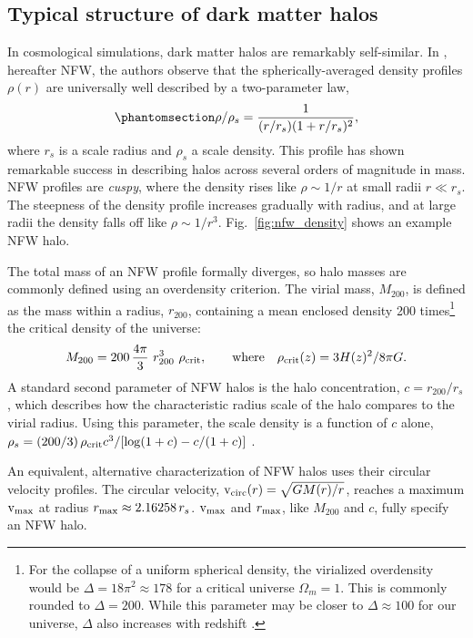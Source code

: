 \subsection{Typical structure of dark matter
halos}\label{typical-structure-of-dark-matter-halos}

In \LCDM{} cosmological simulations, dark matter halos are remarkably
self-similar. In \citet{NFW1996, NFW1997}, hereafter NFW, the authors
observe that the spherically-averaged density profiles \(\rho(r)\) are
universally well described by a two-parameter law,
\begin{equation}\protect\phantomsection\label{eq:nfw}{
\rho/\rho_s= \frac{1}{(r/r_s)(1+r/r_s)^2},
}\end{equation} where \(r_s\) is a scale radius and \(\rho_s\) a scale
density. This profile has shown remarkable success in describing \LCDM{}
halos across several orders of magnitude in mass. NFW profiles are
\emph{cuspy}, where the density rises like \(\rho \sim 1/r\) at small
radii \(r \ll r_s\). The steepness of the density profile increases
gradually with radius, and at large radii the density falls off like
\(\rho \sim 1/r^3\). Fig.~\ref{fig:nfw_density} shows an example NFW
halo.

The total mass of an NFW profile formally diverges, so halo masses are
commonly defined using an overdensity criterion. The virial mass,
\(M_{200}\), is defined as the mass within a radius, \(r_{200}\),
containing a mean enclosed density 200 times\footnote{For the collapse
  of a uniform spherical density, the virialized overdensity would be
  \(\Delta = 18\pi^2\approx 178\) for a critical universe
  \(\Omega_m = 1\). This is commonly rounded to \(\Delta = 200\). While
  this parameter may be closer to \(\Delta \approx 100\) for our
  universe, \(\Delta\) also increases with redshift \citep[using eq. 6
  from][]{bryan+norman1998}.} the critical density of the universe:
\begin{equation}{
M_{200} =200\,\frac{4\pi}{3} \ r_{200}^3\ \rho_{\rm crit}, \qquad {\rm where} \quad \rho_{\rm crit}(z) = 3H(z)^2 / 8\pi G.
}\end{equation} A standard second parameter of NFW halos is the halo
concentration, \(c=r_{200} / r_s\), which describes how the
characteristic radius scale of the halo compares to the virial radius.
Using this parameter, the scale density is a function of \(c\) alone,
\(\rho_s = (200/3)\,\rho_{\rm crit} c^3 / [\log(1+c) - c/(1+c)]\)
\citep{NFW1996}.

An equivalent, alternative characterization of NFW halos uses their
circular velocity profiles. The circular velocity,
\({\rm v}_{\rm circ}(r) = \sqrt{G M(r) / r}\), reaches a maximum \({\rm v}_{\rm max}\) at radius
\(r_{\rm max} \approx 2.16258\,r_s\). \({\rm v}_{\rm max}\) and \(r_{\rm max}\), like
\(M_{200}\) and \(c\), fully specify an NFW halo.

